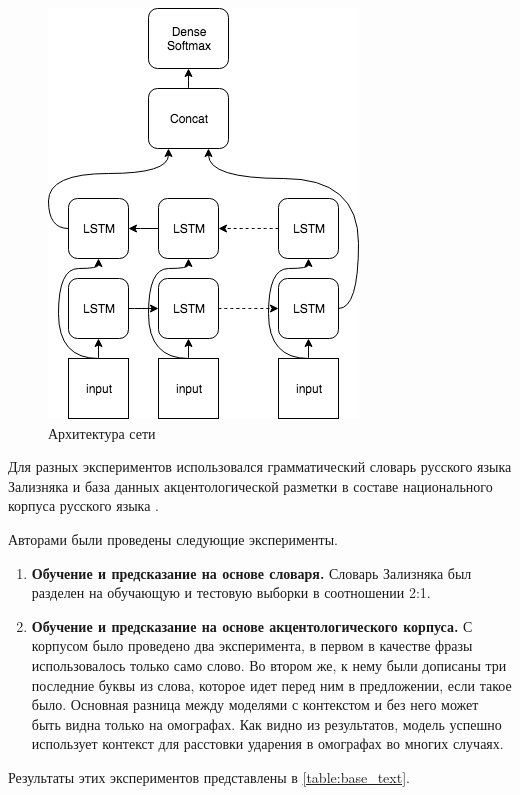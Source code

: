 \documentclass[14pt, a4paper, russian]{extreport}
\begin{document}
\begin{figure}[H]
	\begin{center}
		\includegraphics[width=0.5\linewidth]{Baseline}
	\end{center}
	\caption{\small{Архитектура сети}}
	\label{fig:base_global}
\end{figure}

Для разных экспериментов использовался грамматический словарь русского языка Зализняка \cite{zaliz} и база данных акцентологической разметки в составе национального корпуса русского языка \cite{grishina}. 

Авторами были проведены следующие эксперименты.
\begin{enumerate}[  1{)} ]
	\item \textbf{Обучение и предсказание на основе словаря.} Словарь Зализняка был разделен на обучающую и тестовую выборки в соотношении 2:1.
	\item \textbf{Обучение и предсказание на основе акцентологического корпуса.} С корпусом было проведено два эксперимента, в первом в качестве фразы использовалось только само слово. Во втором же, к нему были дописаны три последние буквы из слова, которое идет перед ним в предложении, если такое было. Основная разница между моделями с контекстом и без него может быть видна только на омографах. Как видно из результатов, модель успешно использует контекст для расстовки ударения в омографах во многих случаях.
\end{enumerate}
Результаты этих экспериментов представлены в \cref{table:base_text}.
\end{document}
